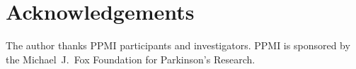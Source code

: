 \section*{Acknowledgements}

The author thanks PPMI participants and investigators. PPMI is sponsored by the Michael~J.~Fox Foundation for Parkinson's Research.


